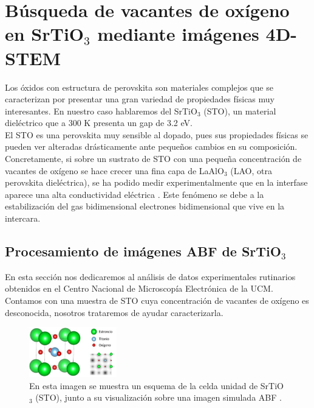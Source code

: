 \section{Búsqueda de vacantes de oxígeno en SrTiO$_3$ mediante imágenes 4D-STEM}


Los óxidos con estructura de perovskita son materiales complejos que se caracterizan por presentar una gran variedad de propiedades físicas muy interesantes. En nuestro caso hablaremos del SrTiO$_3$ (STO), un material dieléctrico que a 300 K presenta un gap de 3.2 eV.\\

El STO es una perovskita muy sensible al dopado, pues sus propiedades físicas se pueden ver alteradas drásticamente ante pequeños cambios en su composición. Concretamente, si sobre un sustrato de STO con una pequeña concentración de vacantes de oxígeno se hace crecer una fina capa de LaAlO$_3$ (LAO, otra perovskita dieléctrica), se ha podido medir experimentalmente que en la interfase aparece una alta conductividad eléctrica \cite{STO}. Este fenómeno se debe a la estabilización del gas bidimensional electrones bidimensional que vive en la intercara.

\subsection{Procesamiento de imágenes ABF de SrTiO$_3$}

En esta sección nos dedicaremos al análisis de datos experimentales rutinarios obtenidos en el Centro Nacional de Microscopía Electrónica de la UCM. Contamos con una muestra de STO cuya concentración de vacantes de oxígeno es desconocida, nosotros trataremos de ayudar caracterizarla.\\

\begin{figure}
    \includegraphics[width=0.34\textwidth]{fig/Fig15.png}
    \caption{En esta imagen se muestra un esquema de la celda unidad de SrTiO$_3$ (STO), junto a su visualización sobre una imagen simulada ABF \cite{paquito}.}
    \label{fig:15}
\end{figure} 

